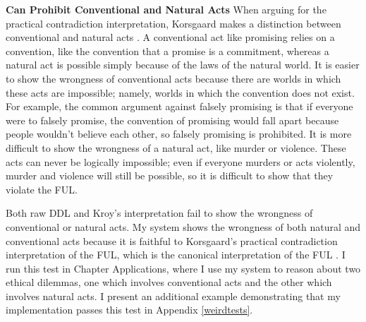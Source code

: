 \begin{isabellebody}
\begin{isamarkuptext}
\medskip%
\end{isamarkuptext}\isamarkuptrue%
%
\begin{isamarkuptext}%
\noindent \textbf{Can Prohibit Conventional and Natural Acts} When arguing for the practical contradiction interpretation,
Korsgaard makes a distinction between conventional and natural acts \citep{KorsgaardFUL}. 
A conventional act like promising relies on a convention, like the 
convention that a promise is a commitment, whereas a natural act is possible simply because of the laws 
of the natural world. It is easier to show the wrongness of conventional acts because there are worlds 
in which these acts are impossible; namely, worlds in which the convention does not exist. For example, 
the common argument against falsely promising is that if everyone were to falsely promise, the convention 
of promising would fall apart because people wouldn't believe each other, so falsely promising is prohibited. 
It is more difficult to show the wrongness of a natural act, like murder or violence. These acts can 
never be logically impossible; even if everyone murders or acts violently, murder and violence will 
still be possible, so it is difficult to show that they violate the FUL. 

Both raw DDL and Kroy's interpretation fail to show the wrongness of conventional or natural acts. 
My system shows the wrongness of both natural and conventional acts because it is faithful to Korsgaard's 
practical contradiction interpretation of the FUL, which is the canonical interpretation of the 
FUL \citep{ebelsduggan, KorsgaardFUL}. I run this test in Chapter Applications, where I
use my system to reason about two ethical dilemmas, one which involves conventional acts and the other which
involves natural acts. I present an additional example demonstrating that my implementation passes
this test in Appendix \ref{weirdtests}.%
\end{isamarkuptext}\isamarkuptrue%
%
\isadelimproof
%
\endisadelimproof
%
\isatagproof
%
\endisatagproof
{\isafoldproof}%
%
\isadelimproof
%
\endisadelimproof
%
\isadelimtheory
%
\endisadelimtheory
%
\isatagtheory
%
\endisatagtheory
{\isafoldtheory}%
%
\isadelimtheory
%
\endisadelimtheory
%
\end{isabellebody}%
\endinput
